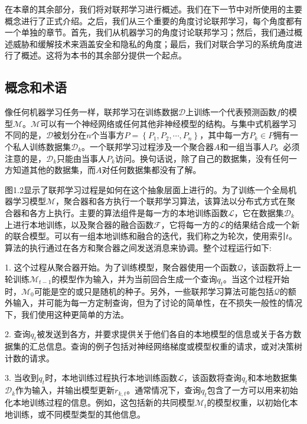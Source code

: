 在本章的其余部分，我们将对联邦学习进行概述。我们在下一节中对所使用的主要概念进行了正式介绍。之后，我们从三个重要的角度讨论联邦学习，每个角度都有一个单独的章节。首先，我们从机器学习的角度讨论联邦学习；然后，我们通过概述威胁和缓解技术来涵盖安全和隐私的角度；最后，我们对联合学习的系统角度进行了概述。这将为本书的其余部分提供一个起点。

\subsection{概念和术语}

像任何机器学习任务一样，联邦学习在训练数据$\mathcal{D}$上训练一个代表预测函数$f$的模型$\mathcal{M}$。$\mathcal{M}$可以有一个神经网络或任何其他非神经模型的结构。与集中式机器学习不同的是，$\mathcal{D}$被划分在$n$个当事方$P=\left\{P_{1}, P_{2}, \cdots , P_{n}\right\}$，其中每一方$P_{k} \in P$拥有一个私人训练数据集$\mathcal{D}_{k}$。一个联邦学习过程涉及一个聚合器$A$和一组当事人$P$。必须注意的是，$\mathcal{D}_{k}$只能由当事人$P_{k}$访问。换句话说，除了自己的数据集，没有任何一方知道其他的数据集，而$A$对任何数据集都没有了解。

图1.2显示了联邦学习过程是如何在这个抽象层面上进行的。为了训练一个全局机器学习模型$\mathcal{M}$，聚合器和各方执行一个联邦学习算法，该算法以分布式方式在聚合器和各方上执行。主要的算法组件是每一方的本地训练函数$\mathcal{L}$，它在数据集$\mathcal{D}_{k}$上进行本地训练，以及聚合器的融合函数$\mathcal{F}$，它将每一方的$\mathcal{L}$的结果结合成一个新的联合模型。可以有一组本地训练和融合的迭代，我们称之为轮次，使用索引$t$。算法的执行通过在各方和聚合器之间发送消息来协调。整个过程运行如下:

1. 这个过程从聚合器开始。为了训练模型，聚合器使用一个函数$\mathcal{Q}$，该函数将上一轮训练$\mathcal{M}_{t-1}$的模型作为输入，并为当前回合生成一个查询$q_{t}$。当这个过程开始时，$\mathcal{M}_{0}$可能是空的或只是随机的种子。另外，一些联邦学习算法可能包括$\mathcal{Q}$的额外输入，并可能为每一方定制查询，但为了讨论的简单性，在不损失一般性的情况下，我们使用这种更简单的方法。

2. 查询$q_{t}$被发送到各方，并要求提供关于他们各自的本地模型的信息或关于各方数据集的汇总信息。查询的例子包括对神经网络梯度或模型权重的请求，或对决策树计数的请求。

3. 当收到$q_{t}$时，本地训练过程执行本地训练函数$\mathcal{L}$，该函数将查询$q_{t}$和本地数据集$\mathcal{D}_{k}$作为输入，并输出模型更新$r_{k,t}$。通常情况下，查询$q_{t}$包含了一方可以用来初始化本地训练过程的信息。例如，这包括新的共同模型$\mathcal{M}_{t}$的模型权重，以初始化本地训练，或不同模型类型的其他信息。


